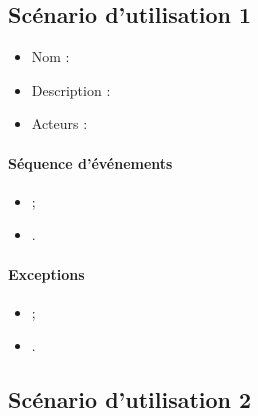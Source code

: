 




\subsection{Scénario d'utilisation 1}
\begin{itemize}
	\item Nom : 
	\item Description : 
	\item Acteurs : 
\end{itemize}

\paragraph{Séquence d'événements}
\begin{itemize}
	\item ;
	\item .
\end{itemize}

\paragraph{Exceptions}
\begin{itemize}
	\item ;
	\item .
\end{itemize}

\subsection{Scénario d'utilisation 2}
